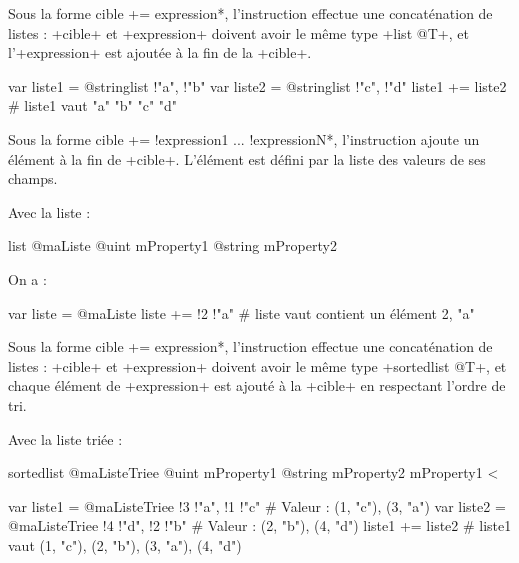 
Sous la forme \ggs*cible += expression*, l'instruction effectue une concaténation de listes : \ggs+cible+ et \ggs+expression+ doivent avoir le même type \ggs+list @T+, et l'\ggs+expression+ est ajoutée à la fin de la \ggs+cible+.

\begin{galgas}
var liste1 = @stringlist {!"a", !"b"}
var liste2 = @stringlist {!"c", !"d"}
liste1 += liste2 # liste1 vaut "a" "b" "c" "d"
\end{galgas}



Sous la forme \ggs*cible += !expression1 ... !expressionN*, l'instruction ajoute un élément à la fin de \ggs+cible+. L'élément est défini par la liste des valeurs de ses champs.

Avec la liste :
\begin{galgas}
list @maListe {
  @uint mProperty1
  @string mProperty2
}
\end{galgas}

On a :

\begin{galgas}
var liste = @maListe {}
liste += !2 !"a" # liste vaut contient un élément 2, "a"
\end{galgas}







Sous la forme \ggs*cible += expression*, l'instruction effectue une concaténation de listes : \ggs+cible+ et \ggs+expression+ doivent avoir le même type \ggs+sortedlist @T+, et chaque élément de \ggs+expression+ est ajouté à la \ggs+cible+ en respectant l'ordre de tri.

Avec la liste triée :
\begin{galgas}
sortedlist @maListeTriee {
  @uint mProperty1
  @string mProperty2
}{
  mProperty1 <
}
\end{galgas}

\begin{galgas}
var liste1 = @maListeTriee {!3 !"a", !1 !"c"} # Valeur : (1, "c"), (3, "a")
var liste2 = @maListeTriee {!4 !"d", !2 !"b"} # Valeur : (2, "b"), (4, "d")
liste1 += liste2 # liste1 vaut (1, "c"), (2, "b"), (3, "a"), (4, "d")
\end{galgas}



